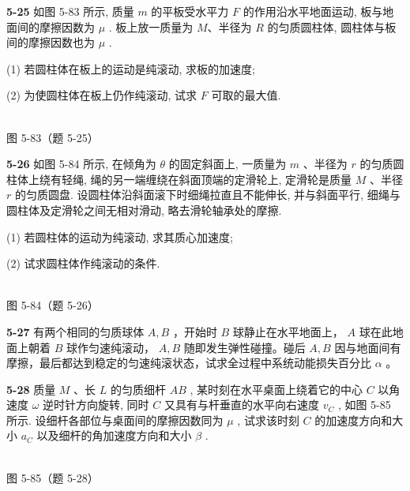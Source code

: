 \textbf{5-25} 如图 5-83 所示, 质量 $m$ 的平板受水平力 $F$ 的作用沿水平地面运动, 板与地面间的摩擦因数为 $\mu$ . 板上放一质量为 $M$、半径为 $R$ 的匀质圆柱体, 圆柱体与板间的摩擦因数也为 $\mu$ .

(1) 若圆柱体在板上的运动是纯滚动, 求板的加速度;

(2) 为使圆柱体在板上仍作纯滚动, 试求 $F$ 可取的最大值.

\begin{center}
\resizebox{0.50\textwidth}{!}{}\\[4pt]
{\small 图 5-83（题 5-25）}
\end{center}

\newpage

\textbf{5-26} 如图 5-84 所示, 在倾角为 $\theta$ 的固定斜面上, 一质量为 $m$ 、半径为 $r$ 的匀质圆柱体上绕有轻绳, 绳的另一端缠绕在斜面顶端的定滑轮上, 定滑轮是质量 $M$ 、半径 $r$ 的匀质圆盘. 设圆柱体沿斜面滚下时细绳拉直且不能伸长, 并与斜面平行, 细绳与圆柱体及定滑轮之间无相对滑动, 略去滑轮轴承处的摩擦.

(1) 若圆柱体的运动为纯滚动, 求其质心加速度;

(2) 试求圆柱体作纯滚动的条件.

\begin{center}
\resizebox{0.50\textwidth}{!}{}\\[4pt]
{\small 图 5-84（题 5-26）}
\end{center}

\newpage

\textbf{5-27} 有两个相同的匀质球体 $A, B$ ，开始时 $B$ 球静止在水平地面上， $A$ 球在此地面上朝着 $B$ 球作匀速纯滚动， $A, B$ 随即发生弹性碰撞。碰后 $A, B$ 因与地面间有摩擦，最后都达到稳定的匀速纯滚状态，试求全过程中系统动能损失百分比 $\alpha$ 。

\newpage

\textbf{5-28} 质量 $M$ 、长 $L$ 的匀质细杆 $AB$ , 某时刻在水平桌面上绕着它的中心 $C$ 以角速度 $\omega$ 逆时针方向旋转, 同时 $C$ 又具有与杆垂直的水平向右速度 $v_{C}$ , 如图 5-85 所示. 设细杆各部位与桌面间的摩擦因数同为 $\mu$ , 试求该时刻 $C$ 的加速度方向和大小 $a_{C}$ 以及细杆的角加速度方向和大小 $\beta$ .

\begin{center}
\resizebox{0.26\textwidth}{!}{}\\[4pt]
{\small 图 5-85（题 5-28）}
\end{center}

